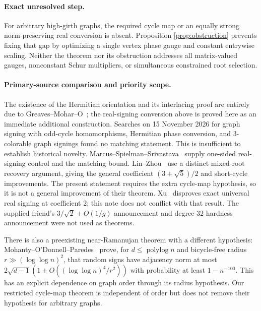 \documentclass[11pt]{article}
\begin{document}
\paragraph{Exact unresolved step.}
For arbitrary high-girth graphs, the required cycle map or an equally
strong norm-preserving real conversion is absent. Proposition
\ref{prop:obstruction} prevents fixing that gap by optimizing a single
vertex phase gauge and constant entrywise scaling. Neither the theorem
nor its obstruction addresses all matrix-valued gauges, nonconstant
Schur multipliers, or simultaneous constrained root selection.

\paragraph{Primary-source comparison and priority scope.}
The existence of the Hermitian orientation and its interlacing proof are
entirely due to Greaves--Mohar--O~\cite{GMO}; the real-signing conversion
above is proved here as an immediate additional construction. Searches
on 15 November 2026 for graph signing with odd-cycle homomorphisms,
Hermitian phase conversion, and $3$-colorable graph signings found no
matching statement. This is insufficient to establish historical novelty.
Marcus--Spielman--Srivastava~\cite{MSS} supply one-sided real-signing
control and the matching bound. Lin--Zhou~\cite{LZ} use a distinct
mixed-root recovery argument, giving the general coefficient
$(3+\sqrt5)/2$ and short-cycle improvements. The present statement
requires the extra cycle-map hypothesis, so it is not a general
improvement of their theorem. Xu~\cite{Xu} disproves exact universal
real signing at coefficient $2$; this note does not conflict with that
result. The supplied friend's $3/\sqrt2+O(1/g)$ announcement and
degree-$32$ hardness announcement were not used as theorems.

There is also a preexisting near-Ramanujan theorem with a different
hypothesis: Mohanty--O'Donnell--Paredes~\cite[Theorem 3.1]{MOP} prove,
for $d\le\operatorname{polylog}n$ and bicycle-free radius
$r\gg(\log\log n)^2$, that random signs have adjacency norm at most
$2\sqrt{d-1}(1+O((\log\log n)^4/r^2))$ with probability at least
$1-n^{-100}$. This has an explicit dependence on graph order through
its radius hypothesis. Our restricted cycle-map theorem is independent
of order but does not remove their hypothesis for arbitrary graphs.
\end{document}
